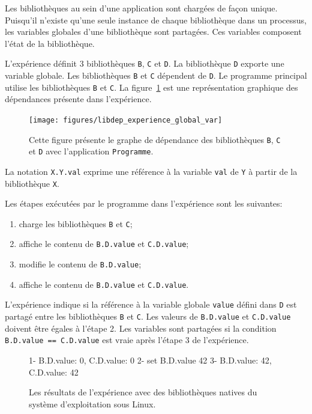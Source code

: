 Les bibliothèques au sein d'une application sont chargées de façon unique.
Puisqu'il n'existe qu'une seule instance de chaque bibliothèque dans un
processus, les variables globales d'une bibliothèque sont partagées. Ces variables
composent l'état de la bibliothèque.

L'expérience définit 3 bibliothèques \texttt{B}, \texttt{C} et \texttt{D}. La bibliothèque
\texttt{D} exporte une variable globale. Les bibliothèques \texttt{B} et \texttt{C} dépendent
de \texttt{D}. Le programme principal utilise les bibliothèques \texttt{B} et \texttt{C}.
La figure~\ref{fig:libdep_experience_global_var} est une représentation graphique des dépendances
présente dans l'expérience.

\begin{figure}[ht]
  \centering
  \texttt{[image: figures/libdep\_experience\_global\_var]}
  \caption{Cette figure présente le graphe de dépendance des bibliothèques \texttt{B}, \texttt{C} et \texttt{D}
    avec l'application \texttt{Programme}.}
  \label{fig:libdep_experience_global_var}
\end{figure}

La notation \texttt{X.Y.val} exprime une référence à la variable \texttt{val}
de \texttt{Y} à partir de la bibliothèque \texttt{X}.

Les étapes exécutées par le programme dans l'expérience sont les suivantes:
\begin{enumerate}
  \item charge les bibliothèques \texttt{B} et \texttt{C};
  \item affiche le contenu de \texttt{B.D.value} et \texttt{C.D.value};
  \item modifie le contenu de \texttt{B.D.value};
  \item affiche le contenu de \texttt{B.D.value} et \texttt{C.D.value}.
\end{enumerate}
L'expérience indique si la référence à la variable globale \texttt{value} défini
dans \texttt{D} est partagé entre les bibliothèques \texttt{B} et \texttt{C}.
Les valeurs de \texttt{B.D.value} et \texttt{C.D.value} doivent être égales à l'étape 2.
Les variables sont partagées si la condition \verb+B.D.value == C.D.value+ est vraie après
l'étape 3 de l'expérience.\\
\begin{figure}[ht]
  \centering
  \lstset{frame=single}
  \begin{mplisting}{0.5}
1- B.D.value: 0,  C.D.value: 0
2- set B.D.value 42
3- B.D.value: 42,  C.D.value: 42
\end{mplisting}
  \caption{Les résultats de l'expérience avec des bibliothèques natives du système d'exploitation sous Linux.}
  \label{fig:result_global_var_experiment}
\end{figure}

